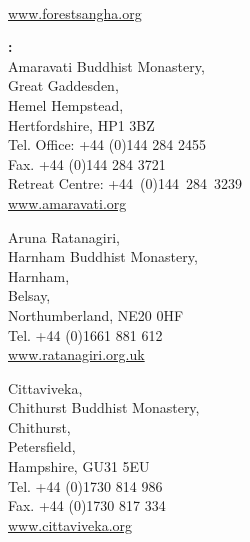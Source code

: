 
{\centering

{\soChapter{\MakeUppercase{\branchMonasteries}}}

\westernDisciplesOfAjahnChah

\portalPageWorldWide\\
\href{http://www.forestsangha.org}{\textcolor{darkgold}{www.forestsangha.org}}
\vspace*{\baselineskip}

\hspace*{10mm}
\begin{minipage}{0.8\linewidth}
\begin{multicols}{2}
\setlength{\parindent}{0pt}
\setlength{\parskip}{1.2em}
\small

{\raggedright

\textbf{\MakeUppercase{\textUnitedKingdom}:}\\
Amaravati Buddhist Monastery,\\
Great Gaddesden,\\
Hemel Hempstead,\\
Hertfordshire, HP1 3BZ\\
Tel. Office: +44 (0)144 284 2455\\
Fax. +44 (0)144 284 3721\\
Retreat Centre: \mbox{+44 (0)144 284 3239}\\
\href{http://www.amaravati.org}{www.amaravati.org}

\vfill

Aruna Ratanagiri,\\
Harnham Buddhist Monastery,\\
Harnham,\\
Belsay,\\
Northumberland, NE20 0HF\\
Tel. +44 (0)1661 881 612\\
\href{http://www.ratanagiri.org.uk}{www.ratanagiri.org.uk}

\vfill

Cittaviveka,\\
Chithurst Buddhist Monastery,\\
Chithurst,\\
Petersfield,\\
Hampshire, GU31 5EU\\
Tel. +44 (0)1730 814 986\\
Fax. +44 (0)1730 817 334\\
\href{http://www.cittaviveka.org}{www.cittaviveka.org}

\vfill

}
\end{multicols}
\end{minipage}}

